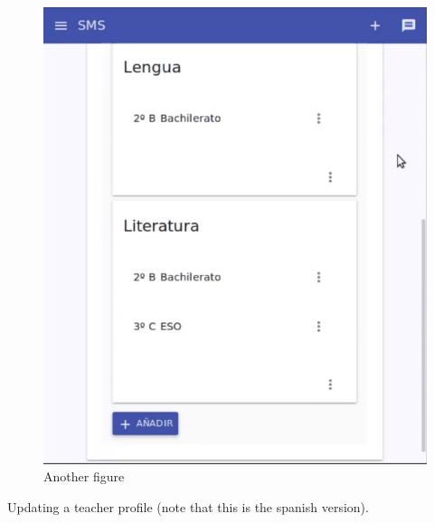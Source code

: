 \begin{figure}[H]
\begin{minipage}{.5\textwidth}
  \includegraphics[scale=0.3]{img/snaps/teacher_profile_2.png}
  \caption{Another figure}
\end{minipage}
\end{figure}

\noindent Updating a teacher profile (note that this is
the spanish version).

